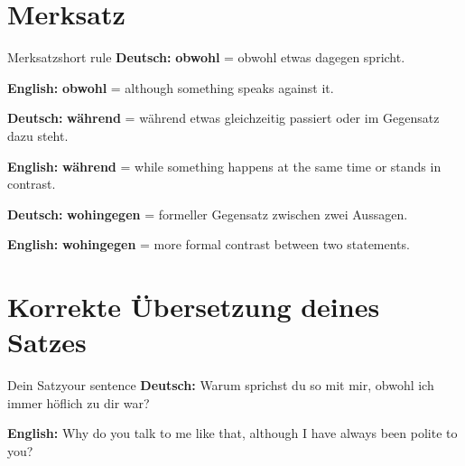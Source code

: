 \documentclass[a4paper,11pt]{article}
\newcommand{\GermanText}[1]{\textbf{Deutsch: }#1\par}
\newcommand{\EnglishText}[1]{{\small\color{SoftGray}\textbf{English: }#1\par}}
\begin{document}
\section{Merksatz}

\begin{grammarentry}{Merksatz}{short rule}
\GermanText{\textbf{obwohl} = obwohl etwas dagegen spricht.}
\EnglishText{\textbf{obwohl} = although something speaks against it.}

\GermanText{\textbf{während} = während etwas gleichzeitig passiert oder im Gegensatz dazu steht.}
\EnglishText{\textbf{während} = while something happens at the same time or stands in contrast.}

\GermanText{\textbf{wohingegen} = formeller Gegensatz zwischen zwei Aussagen.}
\EnglishText{\textbf{wohingegen} = more formal contrast between two statements.}
\end{grammarentry}

\section{Korrekte Übersetzung deines Satzes}

\begin{grammarentry}{Dein Satz}{your sentence}
\GermanText{Warum sprichst du so mit mir, obwohl ich immer höflich zu dir war?}
\EnglishText{Why do you talk to me like that, although I have always been polite to you?}
\end{grammarentry}
\end{document}
